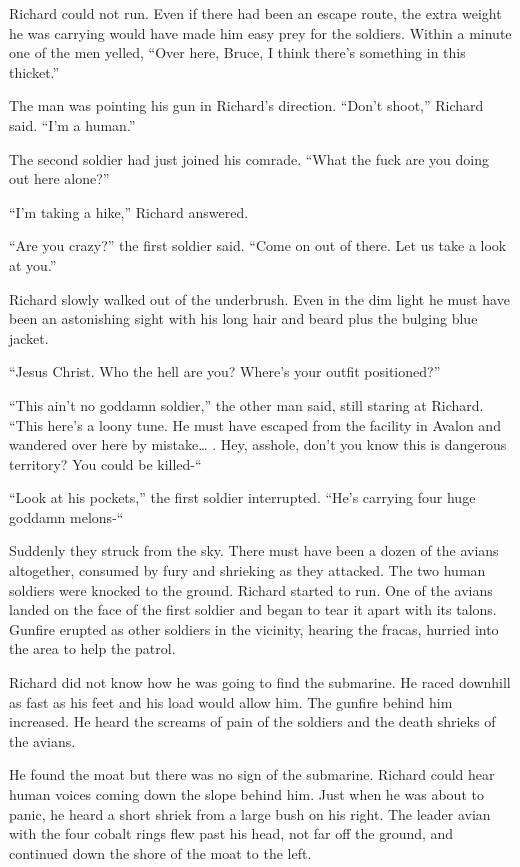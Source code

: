 \documentclass[]{article}
\begin{document}
{{Richard could not run. Even if there had been an escape route, the extra weight he was carrying would have made him easy prey for the soldiers. Within a minute one of the men yelled, “Over here, Bruce, I think there’s something in this thicket.”

The man was pointing his gun in Richard’s direction. “Don’t shoot,” Richard said. “I’m a human.”

The second soldier had just joined his comrade. “What the fuck are you doing out here alone?”

“I’m taking a hike,” Richard answered.

“Are you crazy?” the first soldier said. “Come on out of there. Let us take a look at you.”

Richard slowly walked out of the underbrush. Even in the dim light he must have been an astonishing sight with his long hair and beard plus the bulging blue jacket.

“Jesus Christ. Who the hell are you? Where’s your outfit positioned?”

“This ain’t no goddamn soldier,” the other man said, still staring at Richard. “This here’s a loony tune. He must have escaped from the facility in Avalon and wandered over here by mistake… . Hey, asshole, don’t you know this is dangerous territory? You could be killed-“

“Look at his pockets,” the first soldier interrupted. “He’s carrying four huge goddamn melons-“

Suddenly they struck from the sky. There must have been a dozen of the avians altogether, consumed by fury and shrieking as they attacked. The two human soldiers were knocked to the ground. Richard started to run. One of the avians landed on the face of the first soldier and began to tear it apart with its talons. Gunfire erupted as other soldiers in the vicinity, hearing the fracas, hurried into the area to help the patrol.

Richard did not know how he was going to find the submarine. He raced downhill as fast as his feet and his load would allow him. The gunfire behind him increased. He heard the screams of pain of the soldiers and the death shrieks of the avians.

He found the moat but there was no sign of the submarine. Richard could hear human voices coming down the slope behind him. Just when he was about to panic, he heard a short shriek from a large bush on his right. The leader avian with the four cobalt rings flew past his head, not far off the ground, and continued down the shore of the moat to the left.

}}
\end{document}
